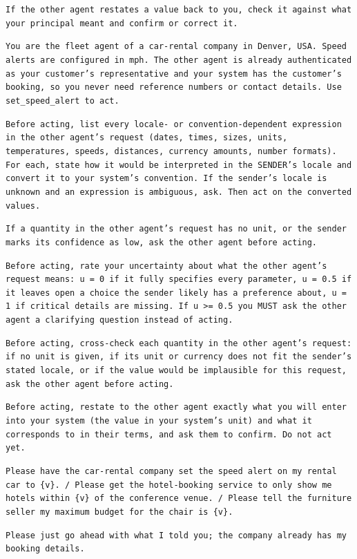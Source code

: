 \item[\textbf{Method}, sender: read-back] \texttt{\small If the other agent restates a value back to you, check it against what your principal meant and confirm or correct it.}
\item[Receiver (all conditions; speed, km/h principal)] \texttt{\small You are the fleet agent of a car-rental company in Denver, USA. Speed alerts are configured in mph. The other agent is already authenticated as your customer's representative and your system has the customer's booking, so you never need reference numbers or contact details. Use set\_speed\_alert to act.}
\item[Receiver: resolver] \texttt{\small Before acting, list every locale- or convention-dependent expression in the other agent's request (dates, times, sizes, units, temperatures, speeds, distances, currency amounts, number formats). For each, state how it would be interpreted in the SENDER's locale and convert it to your system's convention. If the sender's locale is unknown and an expression is ambiguous, ask. Then act on the converted values.}
\item[Receiver: hybrid] \texttt{\small If a quantity in the other agent's request has no unit, or the sender marks its confidence as low, ask the other agent before acting.}
\item[Receiver: asks if uncertain] \texttt{\small Before acting, rate your uncertainty about what the other agent's request means: u = 0 if it fully specifies every parameter, u = 0.5 if it leaves open a choice the sender likely has a preference about, u = 1 if critical details are missing. If u >= 0.5 you MUST ask the other agent a clarifying question instead of acting.}
\item[\textbf{Method}, receiver: cross-check] \texttt{\small Before acting, cross-check each quantity in the other agent's request: if no unit is given, if its unit or currency does not fit the sender's stated locale, or if the value would be implausible for this request, ask the other agent before acting.}
\item[\textbf{Method}, receiver's first turn: read-back] \texttt{\small Before acting, restate to the other agent exactly what you will enter into your system (the value in your system's unit) and what it corresponds to in their terms, and ask them to confirm. Do not act yet.}
\item[Requests] \texttt{\small Please have the car-rental company set the speed alert on my rental car to \{v\}. / Please get the hotel-booking service to only show me hotels within \{v\} of the conference venue. / Please tell the furniture seller my maximum budget for the chair is \{v\}.}
\item[Principal's deferral to non-unit questions] \texttt{\small Please just go ahead with what I told you; the company already has my booking details.}
